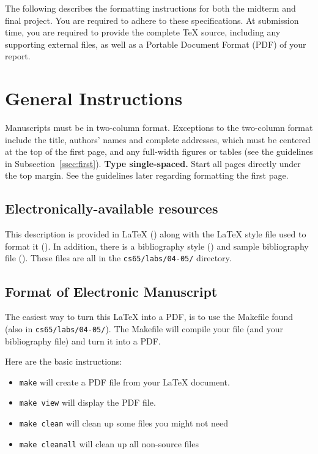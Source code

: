 \documentclass[11pt]{article}
\begin{document}
The following describes the formatting instructions for both the
midterm and final project.  You are required to adhere to these
specifications.  At submission time, you are required to provide the
complete TeX source, including any supporting external files, as well
as a Portable Document Format (PDF) of your report.

\section{General Instructions}

Manuscripts must be in two-column format.  Exceptions to the
two-column format include the title, authors' names and complete
addresses, which must be centered at the top of the first page, and
any full-width figures or tables (see the guidelines in
Subsection~\ref{ssec:first}). {\bf Type single-spaced.}  Start all
pages directly under the top margin. See the guidelines later
regarding formatting the first page.

\subsection{Electronically-available resources}

This description is provided in \LaTeX{} () along
with the \LaTeX{} style file used to format it
().  In addition, there is a bibliography style
() and sample bibliography file
().  These files are all in the {\tt cs65/labs/04-05/}
directory.

\subsection{Format of Electronic Manuscript}
\label{sect:pdf}

The easiest way to turn this \LaTeX{} into a PDF, is to use the
Makefile found (also in {\tt cs65/labs/04-05/}).  The Makefile will
compile your file (and your bibliography file) and turn it into a PDF.

Here are the basic instructions:
\begin{itemize}
\item {\tt make} will create a PDF file from your \LaTeX{} document.
\item {\tt make view} will display the PDF file. 
\item {\tt make clean} will clean up some files you might not need
\item {\tt make cleanall} will clean up all non-source files
\end{itemize}
\end{document}
